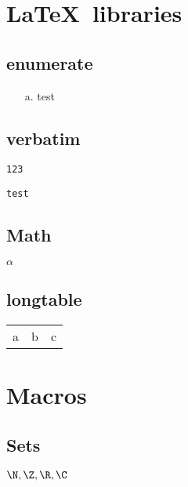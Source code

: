 
\makeindex
\renewcommand\TITLE{Test macros and latextool}
\renewcommand\AUTHOR{Yihsiang Liow}
\renewcommand\SHORTAUTHOR{Y.~Liow}


\topmatter

\chapter{\LaTeX\ libraries}




\section{enumerate}
\begin{enumerate}
\item[a.] test
\end{enumerate}




\section{verbatim}

\verb!123!

\begin{Verbatim}[frame=single, fontsize=\small]
test
\end{Verbatim}

\section{Math}

$\alpha$



\section{longtable}

\begin{longtable}{ccc}
a & b & c \\
\end{longtable}


\chapter{Macros}

\section{Sets}

$\N, \Z, \R, \C$




